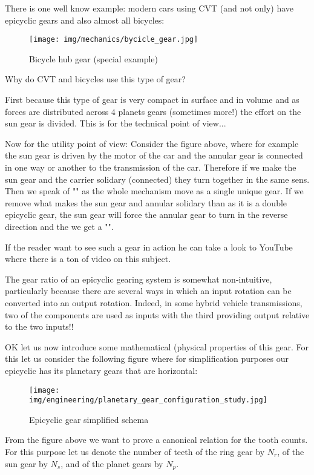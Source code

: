 	There is one well know example: modern cars using CVT (and not only) have epicyclic gears and also almost all bicycles:
	\begin{figure}[H]
		\centering
		\texttt{[image: img/mechanics/bycicle\_gear.jpg]}
		\caption{Bicycle hub gear (special example)}
	\end{figure}

	Why do CVT and bicycles use this type of gear? 
	
	First because this type of gear is very compact in surface and in volume and as forces are distributed across $4$ planets gears (sometimes more!) the effort on the sun gear is divided. This is for the technical point of view...
	
	Now for the utility point of view: Consider the figure above, where for example the sun gear is driven by the motor of the car and the annular gear  is connected in one way or another to the transmission of the car. Therefore if we make the sun gear and the carrier solidary (connected) they turn together in the same sens. Then we speak of "" as the whole mechanism move as a single unique gear. If we remove what makes the sun gear and annular solidary than as it is a double epicyclic gear, the sun gear will force the annular gear to turn in the reverse direction and the we get a "".
	\begin{tcolorbox}[title=Remark,colframe=black,arc=10pt]
	If the reader want to see such a gear in action he can take a look to YouTube where there is a ton of video on this subject.
	\end{tcolorbox}
	The gear ratio of an epicyclic gearing system is somewhat non-intuitive, particularly because there are several ways in which an input rotation can be converted into an output rotation. Indeed, in some hybrid vehicle transmissions, two of the components are used as inputs with the third providing output relative to the two inputs!!
	
	OK let us now introduce some mathematical (physical properties of this gear. For this let us consider the following figure where for simplification purposes our epicyclic has its planetary gears that are horizontal:
	\begin{figure}[H]
		\centering
		\texttt{[image: img/engineering/planetary\_gear\_configuration\_study.jpg]}
		\caption{Epicyclic gear simplified schema}
	\end{figure}
	From the figure above we want to prove a canonical relation for the tooth counts. For this purpose let us denote the number of teeth of the ring gear by $N_r$, of the sun gear by $N_s$, and of the planet gears by $N_p$.
	
